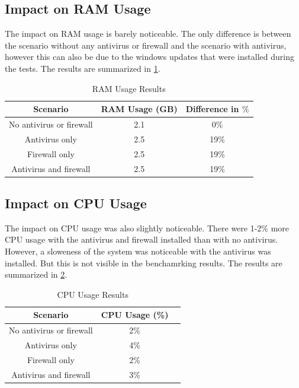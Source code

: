 \documentclass[runningheads,a4paper,english]{llncs}[2022/01/12]
\begin{document}
\subsection{Impact on RAM Usage}\label{sec:ram}

\par The impact on RAM usage is barely noticeable. The only difference is
between the scenario without any antivirus or firewall and the scenario with
antivirus, however this can also be due to the windows updates that were
installed during the tests. The results are summarized in \cref{tab:ram}.

\begin{table}[h]
\centering
  \begin{tabular}{|c|c|c|}
    \hline
    Scenario & RAM Usage (GB) & Difference in $\%$ \\
    \hline
    No antivirus or firewall & 2.1 & 0\% \\
    Antivirus only & 2.5 & 19\% \\
    Firewall only & 2.5 & 19\% \\
    Antivirus and firewall & 2.5 & 19\% \\
    \hline
  \end{tabular}
  \caption{RAM Usage Results}
  \label{tab:ram}
\end{table}

\subsection{Impact on CPU Usage}\label{sec:cpu}

\par The impact on CPU usage was also slightly noticeable. There were 1-2\%
more CPU usage with the antivirus and firewall installed than with no
antivirus. However, a sloweness of the system was noticeable with the antivirus
was installed. But this is not visible in the benchamrking results. The results
are summarized in \cref{tab:cpu}.

\begin{table}[h]
\centering
  \begin{tabular}{|c|c|c|}
    \hline
    Scenario & CPU Usage (\%) \\
    \hline
    No antivirus or firewall & 2\% \\
    Antivirus only & 4\% \\
    Firewall only & 2\% \\
    Antivirus and firewall & 3\% \\
    \hline
  \end{tabular}
  \caption{CPU Usage Results}
  \label{tab:cpu}
\end{table}
\end{document}
